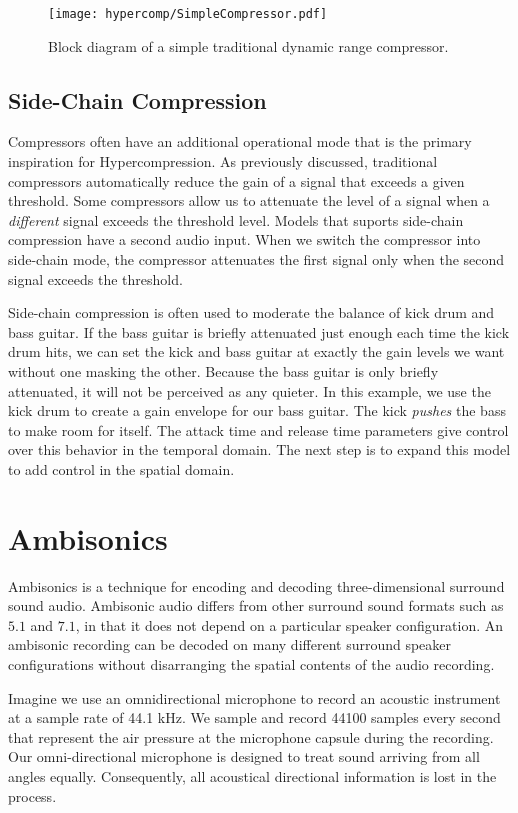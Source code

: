 \begin{figure*}
  \texttt{[image: hypercomp/SimpleCompressor.pdf]}
  \caption{Block diagram of a simple traditional dynamic range
    compressor.}
  \label{fig:comp-block}
\end{figure*}

\subsection{Side-Chain Compression}
\label{sec:side-chain-compr}
Compressors often have an additional operational mode that is the
primary inspiration for Hypercompression. As previously discussed,
traditional compressors automatically reduce the gain of a signal that
exceeds a given threshold. Some compressors allow us to attenuate the
level of a signal when a \emph{different} signal exceeds the threshold
level. Models that suports side-chain compression have a second audio
input. When we switch the compressor into side-chain mode, the
compressor attenuates the first signal only when the second signal
exceeds the threshold.

Side-chain compression is often used to moderate the balance of kick
drum and bass guitar. If the bass guitar is briefly attenuated just
enough each time the kick drum hits, we can set the kick and bass
guitar at exactly the gain levels we want without one masking the
other. Because the bass guitar is only briefly attenuated, it will not
be perceived as any quieter. In this example, we use the kick drum to
create a gain envelope for our bass guitar. The kick \emph{pushes} the
bass to make room for itself. The attack time and release time
parameters give control over this behavior in the temporal domain. The
next step is to expand this model to add control in the spatial
domain.

\section{Ambisonics}
\label{sec:ambisonics}
Ambisonics is a technique for encoding and decoding three-dimensional
surround sound audio.\cite[-15mm]{Gerzon1973,Gerzon1985} Ambisonic
audio differs from other surround sound formats such as $5.1$ and $7.1$,
in that it does not depend on a particular speaker configuration. An
ambisonic recording can be decoded on many different surround speaker
configurations without disarranging the spatial contents of the audio
recording.

Imagine we use an omnidirectional microphone to record an acoustic
instrument at a sample rate of 44.1 kHz. We sample and record 44100
samples every second that represent the air pressure at the microphone
capsule during the recording. Our omni-directional microphone is
designed to treat sound arriving from all angles
equally. Consequently, all acoustical directional information is lost
in the process.

